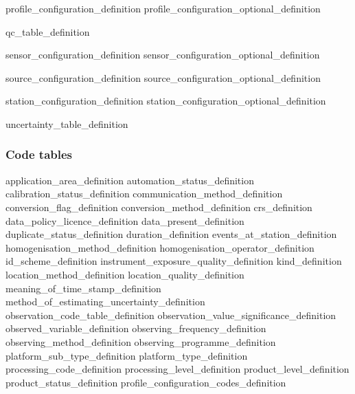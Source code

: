 \documentclass[a4paper,12pt]{article}
\begin{document}
 {profile_configuration_definition}
 {profile_configuration_optional_definition}

 {qc_table_definition}

 {sensor_configuration_definition}
 {sensor_configuration_optional_definition}

 {source_configuration_definition}
 {source_configuration_optional_definition}

 {station_configuration_definition} %
 {station_configuration_optional_definition} %

 {uncertainty_table_definition}


\FloatBarrier
\newpage
\subsubsection {Code tables}
 {application_area_definition} %
 {automation_status_definition} %
 {calibration_status_definition} %
 {communication_method_definition} %
 {conversion_flag_definition} %
 {conversion_method_definition} %
 {crs_definition} %
 {data_policy_licence_definition} %
 {data_present_definition} %
 {duplicate_status_definition} %
 {duration_definition} %
 {events_at_station_definition} %
 {homogenisation_method_definition}
 {homogenisation_operator_definition}
 {id_scheme_definition} %
 {instrument_exposure_quality_definition} %
 {kind_definition} %
 {location_method_definition} %
 {location_quality_definition} %
 {meaning_of_time_stamp_definition} %
 {method_of_estimating_uncertainty_definition} %
 {observation_code_table_definition} %
 {observation_value_significance_definition} %
 {observed_variable_definition} %
 {observing_frequency_definition} %
 {observing_method_definition} %
 {observing_programme_definition} %
 {platform_sub_type_definition} %
 {platform_type_definition} %
 {processing_code_definition} %
 {processing_level_definition} %
 {product_level_definition} %
 {product_status_definition} %
 {profile_configuration_codes_definition}
\end{document}
